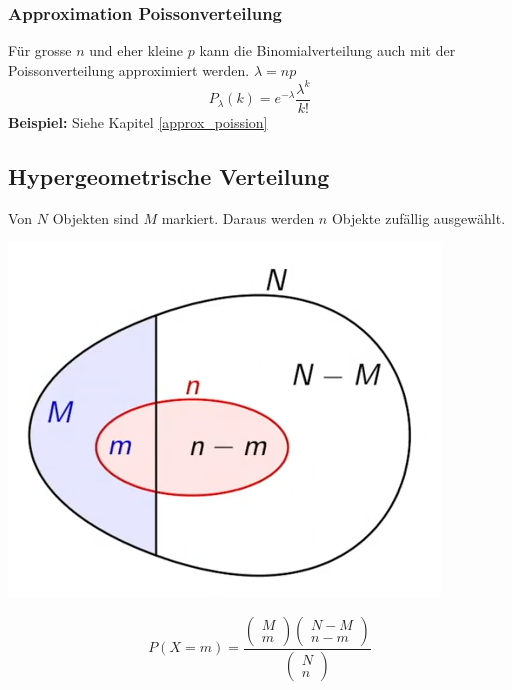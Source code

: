\subsubsection{Approximation Poissonverteilung}
Für grosse $n$ und eher kleine $p$ kann die Binomialverteilung auch mit der Poissonverteilung approximiert werden. $\lambda = np$
\[
P_\lambda(k) = e^{-\lambda}\frac{\lambda^k}{k!}
\]
\noindent\textbf{Beispiel:} Siehe Kapitel \ref{approx_poission}

\subsection{Hypergeometrische Verteilung}
Von $N$ Objekten sind $M$ markiert. Daraus werden $n$ Objekte zufällig ausgewählt.

\begin{center}
	\begin{minipage}{0.20\textwidth}
		\begin{center}
			\includegraphics[width=\linewidth,keepaspectratio=true]{Images/hypergem-verteilung}\\
		\end{center}
	\end{minipage}%
	\begin{minipage}{0.3\textwidth}
	\[
	P(X=m) = \frac{\begin{pmatrix}	M \\ m\end{pmatrix}\begin{pmatrix}	N-M \\ n-m\end{pmatrix}}{\begin{pmatrix} N \\ n\end{pmatrix}}
	\]
	\end{minipage}
\end{center}


